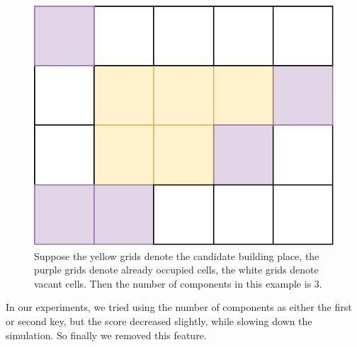 \begin{figure}
\center
\includegraphics[scale=0.5]{numComponents.pdf}
\caption{
Suppose the yellow grids denote the candidate building place,
the purple grids denote already occupied cells,
the white grids denote vacant cells.
Then the number of components in this example is 3.}
\label{fig: numComponents}
\end{figure}

In our experiments, we tried using the number of components as either the first or second key, but the score decreased slightly, while slowing down the simulation. So finally we removed this feature.
